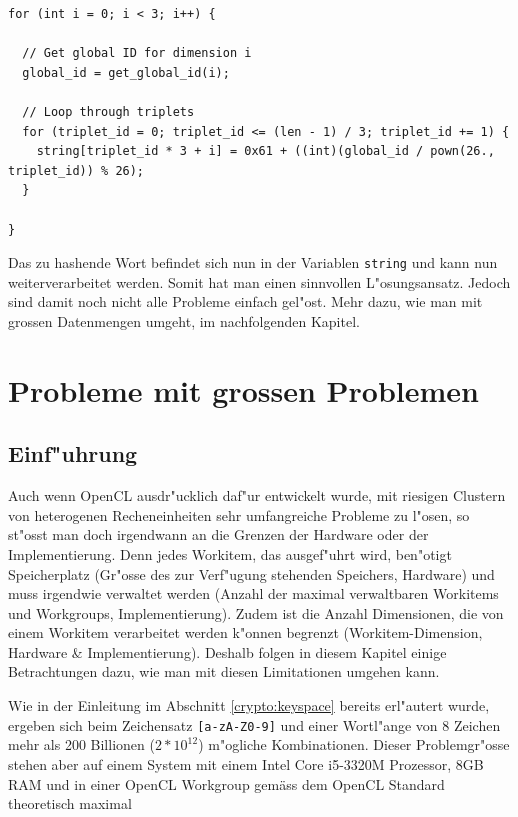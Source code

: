\begin{refsection}
\begin{small}
\begin{verbatim}
for (int i = 0; i < 3; i++) {

  // Get global ID for dimension i
  global_id = get_global_id(i);

  // Loop through triplets
  for (triplet_id = 0; triplet_id <= (len - 1) / 3; triplet_id += 1) {
    string[triplet_id * 3 + i] = 0x61 + ((int)(global_id / pown(26., triplet_id)) % 26);
  }

}
\end{verbatim}
\end{small}

\noindent Das zu hashende Wort befindet sich nun in der Variablen
\texttt{string} und kann nun weiterverarbeitet werden. Somit hat man einen
sinnvollen L"osungsansatz. Jedoch sind damit noch nicht alle Probleme einfach
gel"ost. Mehr dazu, wie man mit grossen Datenmengen umgeht, im nachfolgenden
Kapitel.


\section{Probleme mit grossen Problemen}
\label{crypto:grosse_probleme}

\subsection{Einf"uhrung}

Auch wenn OpenCL ausdr"ucklich daf"ur entwickelt wurde, mit riesigen Clustern
von heterogenen Recheneinheiten sehr umfangreiche Probleme zu l"osen, so st"osst
man doch irgendwann an die Grenzen der Hardware oder der Implementierung.  Denn
jedes Workitem, das ausgef"uhrt wird, ben"otigt Speicherplatz (Gr"osse des zur
Verf"ugung stehenden Speichers, Hardware) und muss irgendwie verwaltet werden
(Anzahl der maximal verwaltbaren Workitems und Workgroups, Implementierung).
Zudem ist die Anzahl Dimensionen, die von einem Workitem verarbeitet werden k"onnen
begrenzt (Workitem-Dimension, Hardware \& Implementierung). Deshalb folgen in
diesem Kapitel einige Betrachtungen dazu, wie man mit diesen Limitationen
umgehen kann.

Wie in der Einleitung im Abschnitt \ref{crypto:keyspace} bereits erl"autert
wurde, ergeben sich beim Zeichensatz \texttt{[a-zA-Z0-9]} und einer Wortl"ange
von 8 Zeichen mehr als 200 Billionen ($2 * 10^{12}$) m"ogliche Kombinationen.
Dieser Problemgr"osse stehen aber auf einem System mit einem Intel Core i5-3320M
Prozessor, 8GB RAM und in einer OpenCL Workgroup gemäss dem OpenCL Standard
theoretisch maximal


\end{refsection}
